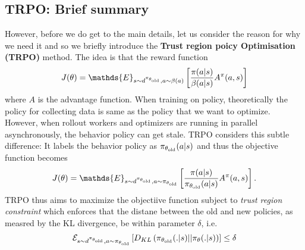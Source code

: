 \subsection{TRPO: Brief summary}
However, before we do get to the main details, let us consider the reason for why we need it and so we briefly introduce the \textbf{Trust region poicy Optimisation (TRPO)} method. The idea is that the reward function 
\begin{align}
    J(\theta) = \mathds{E}_{s\sim d^{\pi_{\theta_{\rm{old}}}},a\sim \beta(a)}\left[\frac{\pi(a|s)}{\beta(a|s)} A^{\pi}(a,s) \right ]
\end{align}
where $A$ is the advantage function. When training on policy, theoretically the policy for collecting data is same as the policy that we want to optimize. However, when rollout workers and optimizers are running in parallel asynchronously, the behavior policy can get stale. TRPO considers this subtle difference: It labels the behavior policy as $\pi_{\theta_{\rm{old}}}(a|s)$ 
and thus the objective function becomes
\begin{align}
    J(\theta) = \mathds{E}_{s\sim d^{\pi_{\theta_{\rm{old}}}},a\sim \pi_{\theta_{\rm{old}}}}\left[\frac{\pi(a|s)}{\pi_{\theta_{\rm{old}}}(a|s)} A^{\pi}(a,s) \right ].
\end{align}
TRPO thus aims to maximize the objectiive function subject to  \textit{trust region constraint} which enforces that the distane between the old and new policies, as measred by the KL divergence, be within parameter $\delta$, i.e.
\begin{align}
    \mathcal{E}_{s\sim d^{\pi_{\theta_{\rm{old}}}},a\sim \pi_{\theta_{\rm{old}}}} \left[D_{KL}\left(\pi_{\theta_{\rm{old}}}(.|s)|| \pi_{\theta}(.|s)\right) \right] \leq \delta
\end{align}

